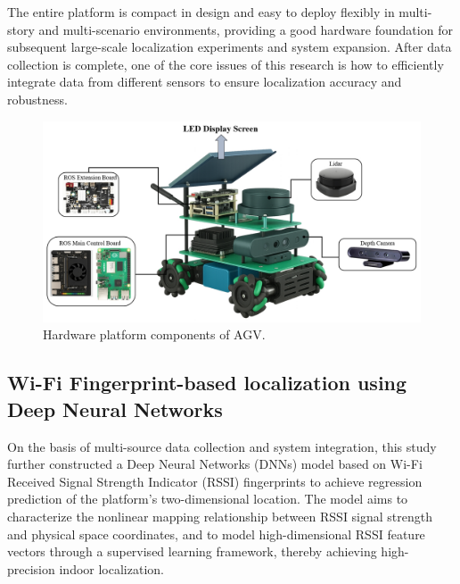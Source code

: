 \documentclass[12pt,a4paper]{article}
\numberwithin{equation}{section}
\begin{document}
The entire platform is compact in design and easy to deploy flexibly in
multi-story and multi-scenario environments, providing a good hardware
foundation for subsequent large-scale localization experiments and system
expansion. After data collection is complete, one of the core issues of this
research is how to efficiently integrate data from different sensors to ensure
localization accuracy and robustness.
\begin{figure}[H]
  \centering
  \includegraphics[width=0.95\linewidth]{images/Hardware.png}
  \caption{Hardware platform components of AGV.}
  \label{fig:Hardware platform components of AGV}
\end{figure}

\subsection{Wi-Fi Fingerprint-based localization using Deep Neural Networks }
On the basis of multi-source data collection and system integration, this study
further constructed a Deep Neural Networks (DNNs) model based on Wi-Fi Received
Signal Strength Indicator (RSSI)
fingerprints to achieve regression prediction of the platform's
two-dimensional location. The model aims to characterize the nonlinear mapping
relationship between RSSI signal strength and physical space coordinates, and to
model high-dimensional RSSI feature vectors through a supervised learning
framework, thereby achieving high-precision indoor localization.
\end{document}
